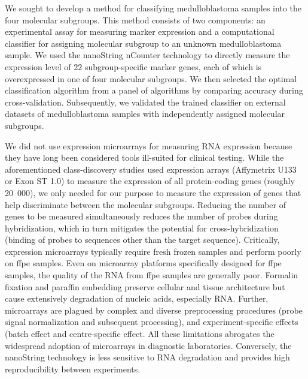 We sought to develop a method for classifying medulloblastoma samples into the four molecular subgroups. This method consists of two components: an experimental assay for measuring marker expression and a computational classifier for assigning molecular subgroup to an unknown medulloblastoma sample. We used the nanoString nCounter technology  to directly measure the expression level of 22 subgroup-specific marker genes, each of which is overexpressed in one of four molecular subgroups. We then selected the optimal classification algorithm from a panel of algorithms by comparing accuracy during cross-validation. Subsequently, we validated the trained classifier on external datasets of medulloblastoma samples with independently assigned molecular subgroups.

We did not use expression microarrays for measuring RNA expression because they have long been considered tools ill-suited for clinical testing. While the aforementioned class-discovery studies used expression arrays (Affymetrix U133 or Exon ST 1.0) to measure the expression of all protein-coding genes (roughly 20~000), we only needed for our purpose to measure the expression of genes that help discriminate between the molecular subgroups.  Reducing the number of genes to be measured simultaneously reduces the number of probes during hybridization, which in turn mitigates the potential for cross-hybridization (binding of probes to sequences other than the target sequence). Critically, expression microarrays typically require fresh frozen samples and perform poorly on \gls{ffpe} samples. Even on microarray platforms specifically designed for \gls{ffpe} samples, the quality of the RNA from \gls{ffpe} samples are generally poor. Formalin fixation and paraffin embedding preserve cellular and tissue architecture but cause extensively degradation of nucleic acids, especially RNA. Further, microarrays are plagued by complex and diverse preprocessing procedures (probe signal normalization and subsequent processing), and experiment-specific effects (batch effect and centre-specific effect. All these limitations abrogates the widespread adoption of microarrays in diagnostic laboratories. Conversely, the nanoString technology is less sensitive to RNA degradation and provides high reproducibility between experiments.

